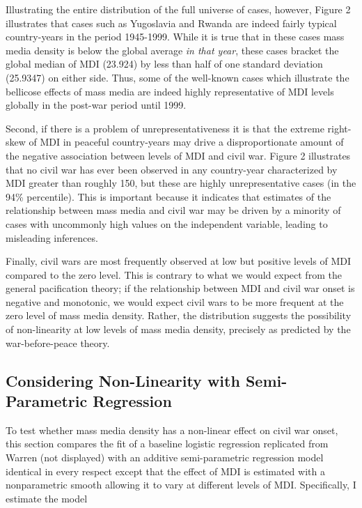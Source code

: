 \documentclass[12pt,article,oneside]{memoir}
\begin{document}
Illustrating the entire distribution of the full universe of cases,
however, Figure 2 illustrates that cases such as Yugoslavia and Rwanda
are indeed fairly typical country-years in the period 1945-1999. While
it is true that in these cases mass media density is below the global
average \emph{in that year}, these cases bracket the global median of
MDI (23.924) by less than half of one standard deviation (25.9347) on
either side. Thus, some of the well-known cases which illustrate the
bellicose effects of mass media are indeed highly representative of MDI
levels globally in the post-war period until 1999.

Second, if there is a problem of unrepresentativeness it is that the
extreme right-skew of MDI in peaceful country-years may drive a
disproportionate amount of the negative association between levels of
MDI and civil war. Figure 2 illustrates that no civil war has ever been
observed in any country-year characterized by MDI greater than roughly
150, but these are highly unrepresentative cases (in the 94\%
percentile). This is important because it indicates that estimates of
the relationship between mass media and civil war may be driven by a
minority of cases with uncommonly high values on the independent
variable, leading to misleading inferences.

Finally, civil wars are most frequently observed at low but positive
levels of MDI compared to the zero level. This is contrary to what we
would expect from the general pacification theory; if the relationship
between MDI and civil war onset is negative and monotonic, we would
expect civil wars to be more frequent at the zero level of mass media
density. Rather, the distribution suggests the possibility of
non-linearity at low levels of mass media density, precisely as
predicted by the war-before-peace theory.

\subsection{Considering Non-Linearity with Semi-Parametric
Regression}\label{considering-non-linearity-with-semi-parametric-regression}

To test whether mass media density has a non-linear effect on civil war
onset, this section compares the fit of a baseline logistic regression
replicated from Warren (not displayed) with an additive semi-parametric
regression model identical in every respect except that the effect of
MDI is estimated with a nonparametric smooth allowing it to vary at
different levels of MDI. Specifically, I estimate the model
\end{document}
